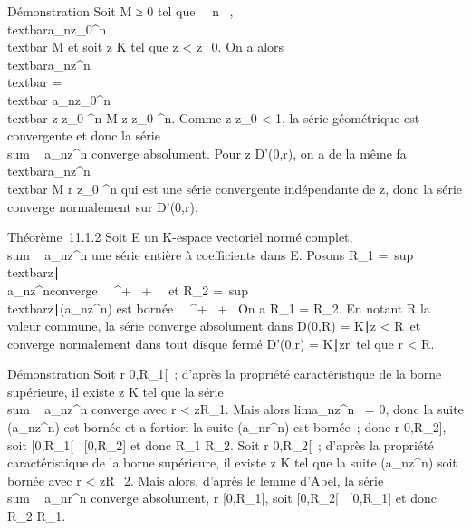 \documentclass[]{article}
\begin{document}
Démonstration Soit M ≥ 0 tel que \forall~~n \in {}~,
\\textbar{}a\_nz\_0^n\\textbar{}
\leq M et soit z \in K tel que \textbar{}z\textbar{} \textless{}
\textbar{}z\_0\textbar{}. On a alors
\\textbar{}a\_nz^n\\textbar{}
=\\textbar{}
a\_nz\_0^n\\textbar{}
\left \textbar{} z \over z\_0
\right \textbar{}^n \leq M\left
\textbar{} z \over z\_0 \right
\textbar{}^n. Comme \left \textbar{} z
\over z\_0 \right \textbar{}
\textless{} 1, la série géométrique est convergente et donc la série
\\sum ~
a\_nz^n converge absolument. Pour z \in D'(0,r), on a
de la même fa\ccon
\\textbar{}a\_nz^n\\textbar{}
\leq M\left \textbar{} r \over
z\_0 \right \textbar{}^n qui est une
série convergente indépendante de z, donc la série converge normalement
sur D'(0,r).

Théorème~11.1.2 Soit E un K-espace vectoriel normé complet,
\\sum ~
a\_nz^n une série entière à coefficients dans E.
Posons R\_1 =\
sup\\textbar{}z\textbar{}∣\\\sum
 a\_nz^n\text converge
\ \in {}~^+ \cup\ +
\infty~\ et R\_2 =\
sup\\textbar{}z\textbar{}∣(a\_nz^n)\text
est bornée \ \in {}~^+ \cup\ +
\infty~\. On a R\_1 = R\_2. En notant R la
valeur commune, la série converge absolument dans D(0,R) =
\z \in K∣\textbar{}z\textbar{}
\textless{} R\ et converge normalement dans tout disque
fermé D'(0,r) = \z \in
K∣\textbar{}z\textbar{}\leq r\
tel que r \textless{} R.

Démonstration Soit r \in {[}0,R\_1{[}~; d'après la propriété
caractéristique de la borne supérieure, il existe z \in K tel que la série
\\sum ~
a\_nz^n converge avec r \textless{}
\textbar{}z\textbar{}\leq R\_1. Mais alors
lima\_nz^n~ = 0, donc la
suite (a\_nz^n) est bornée et a fortiori la suite
(a\_nr^n) est bornée~; donc r \in {[}0,R\_2{]},
soit {[}0,R\_1{[}\subset~ {[}0,R\_2{]} et donc R\_1 \leq
R\_2. Soit r \in {[}0,R\_2{[}~; d'après la propriété
caractéristique de la borne supérieure, il existe z \in K tel que la suite
(a\_nz^n) soit bornée avec r \textless{}
\textbar{}z\textbar{}\leq R\_2. Mais alors, d'après le lemme
d'Abel, la série \\sum ~
a\_nr^n converge absolument, r \in
{[}0,R\_1{]}, soit {[}0,R\_2{[}\subset~ {[}0,R\_1{]} et
donc R\_2 \leq R\_1.
\end{document}
